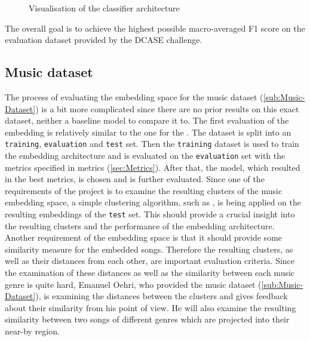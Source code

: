 \begin{figure}[htbp]
    \captionsetup{format=plain}
    \centering
    \caption{Visualisation of the classifier architecture}
    \label{fig:Classifier-DCASE-Visualisation}
\end{figure}
\noindent
The overall goal is to achieve the highest possible macro-averaged F1 score on the evaluation dataset provided by the DCASE challenge.

\subsection{Music dataset}
\label{sub:Eval-Music}
The process of evaluating the embedding space for the music dataset (\ref{sub:Music-Dataset}) is a bit more complicated since there are no prior results on this exact dataset, neither a baseline model to compare it to. The first evaluation of the embedding is relatively similar to the one for the . The dataset is split into an \texttt{training}, \texttt{evaluation} and \texttt{test} set. Then the \texttt{training} dataset is used to train the embedding architecture and is evaluated on the \texttt{evaluation} set with the metrics specified in metrics (\ref{sec:Metrics}). After that, the model, which resulted in the best metrics, is chosen and is further evaluated.
\newline
\newline
Since one of the requirements of the project is to examine the resulting clusters of the music embedding space, a simple clustering algorithm, such as , is being applied on the resulting embeddings of the \texttt{test} set. This should provide a crucial insight into the resulting clusters and the performance of the embedding architecture.
\newline
\newline
Another requirement of the embedding space is that it should provide some similarity measure for the embedded songs. Therefore the resulting clusters, as well as their distances from each other, are important evaluation criteria. Since the examination of these distances as well as the similarity between each music genre is quite hard, Emanuel Oehri, who provided the music dataset (\ref{sub:Music-Dataset}), is examining the distances between the clusters and gives feedback about their similarity from his point of view. He will also examine the resulting similarity between two songs of different genres which are projected into their near-by region.

